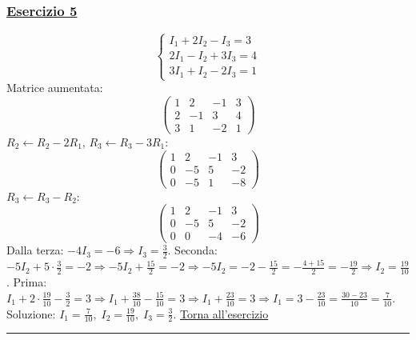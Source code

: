 \subsubsection*{\hyperref[ex:5]{Esercizio 5}}
\[
\begin{cases}
I_1 + 2I_2 - I_3 = 3 \\
2I_1 - I_2 + 3I_3 = 4 \\
3I_1 + I_2 - 2I_3 = 1
\end{cases}
\]
Matrice aumentata:
\[
\left(\begin{array}{ccc|c}
1 & 2 & -1 & 3 \\
2 & -1 & 3 & 4 \\
3 & 1 & -2 & 1
\end{array}\right)
\]
\(R_2 \leftarrow R_2 - 2R_1\), \(R_3 \leftarrow R_3 - 3R_1\):
\[
\left(\begin{array}{ccc|c}
1 & 2 & -1 & 3 \\
0 & -5 & 5 & -2 \\
0 & -5 & 1 & -8
\end{array}\right)
\]
\(R_3 \leftarrow R_3 - R_2\):
\[
\left(\begin{array}{ccc|c}
1 & 2 & -1 & 3 \\
0 & -5 & 5 & -2 \\
0 & 0 & -4 & -6
\end{array}\right)
\]
Dalla terza: \(-4I_3 = -6 \Rightarrow I_3 = \frac{3}{2}\).
Seconda: \(-5I_2 + 5\cdot\frac{3}{2} = -2 \Rightarrow -5I_2 + \frac{15}{2} = -2 \Rightarrow -5I_2 = -2 - \frac{15}{2} = -\frac{4+15}{2} = -\frac{19}{2} \Rightarrow I_2 = \frac{19}{10}\).
Prima: \(I_1 + 2\cdot\frac{19}{10} - \frac{3}{2} = 3 \Rightarrow I_1 + \frac{38}{10} - \frac{15}{10} = 3 \Rightarrow I_1 + \frac{23}{10} = 3 \Rightarrow I_1 = 3 - \frac{23}{10} = \frac{30-23}{10} = \frac{7}{10}\).
Soluzione: \(\displaystyle I_1 = \frac{7}{10},\; I_2 = \frac{19}{10},\; I_3 = \frac{3}{2}\). \hfill \hyperlink{ex:5}{Torna all'esercizio}\\
\hrule

